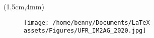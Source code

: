 \documentclass[a4paper, 10pt, twoside]{article}
\begin{document}
  \begin{textblock*}{3cm}(1.5cm,4mm)
    \begin{figure}[h]
      \texttt{[image: /home/benny/Documents/LaTeX assets/Figures/UFR\_IM2AG\_2020.jpg]}\\[.1cm] %
    \end{figure}
  \end{textblock*}

\end{document}
